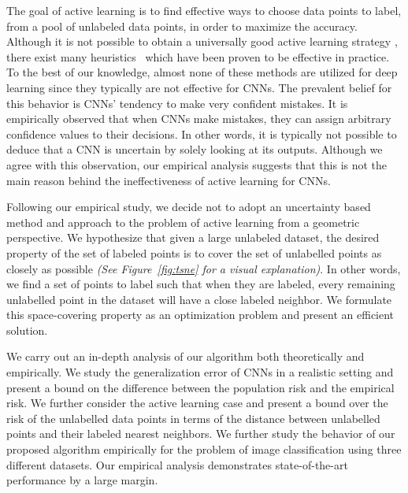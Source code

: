 \documentclass{article}
\begin{document}
The goal of active learning is to find effective ways to choose data points to label, from a pool of unlabeled data points, in order to maximize the accuracy. Although it is not possible to obtain a universally good active learning strategy \cite{dasgupta2004analysis}, there exist many heuristics~\cite{settles2010active} which have been proven to be effective in practice. To the best of our knowledge, almost none of these methods are utilized for deep learning since they typically are not effective for CNNs. The prevalent belief for this behavior is CNNs' tendency to make very confident mistakes. It is empirically observed that when CNNs make mistakes, they can assign arbitrary confidence values to their decisions. In other words, it is typically not possible to deduce that a CNN is uncertain by solely looking at its outputs. Although we agree with this observation, our empirical analysis suggests that this is not the main reason behind the ineffectiveness of active learning for CNNs. 

Following our empirical study, we decide not to adopt an uncertainty based method and approach to the problem of active learning from a geometric perspective. We hypothesize that given a large unlabeled dataset, the desired property of the set of labeled points is to cover the set of unlabelled points as closely as possible \emph{(See Figure~\ref{fig:tsne} for a visual explanation)}. In other words, we find a set of points to label such that when they are labeled, every remaining unlabelled point in the dataset will have a close labeled neighbor. We formulate this space-covering property as an optimization problem and present an efficient solution.

We carry out an in-depth analysis of our algorithm both theoretically and empirically. We study the generalization error of CNNs in a realistic setting and present a bound on the difference between the population risk and the empirical risk. We further consider the active learning case and present a bound over the risk of the unlabelled data points in terms of the distance between unlabelled points and their labeled nearest neighbors. We further study the behavior of our proposed algorithm empirically for the problem of image classification using three different datasets. Our empirical analysis demonstrates state-of-the-art performance by a large margin. 

\end{document}
